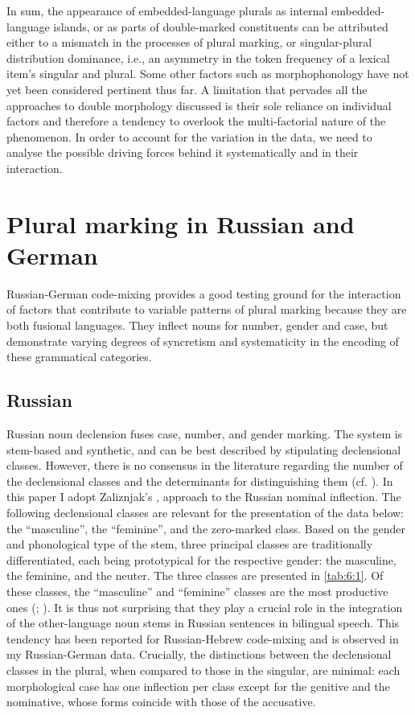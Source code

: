 In sum, the appearance of embedded-language plurals as internal embedded-language islands, or as parts of double-marked constituents can be attributed either to a mismatch in the processes of plural marking, or singular-plural distribution dominance, i.e., an asymmetry in the token frequency of a lexical item’s singular and plural. Some other factors such as morphophonology have not yet been considered pertinent thus far. A limitation that pervades all the approaches to double morphology discussed is their sole reliance on individual factors and therefore a tendency to overlook the multi-factorial nature of the phenomenon. In order to account for the variation in the data, we need to analyse the possible driving forces behind it systematically and in their interaction.

\section{Plural marking in Russian and German}\label{sec:plural marking}

Russian-German code-mixing provides a good testing ground for the interaction of factors that contribute to variable patterns of plural marking because they are both fusional languages. They inflect nouns for number, gender and case, but demonstrate varying degrees of syncretism and systematicity in the encoding of these grammatical categories.

\subsection{Russian}

Russian noun declension fuses case, number, and gender marking. The system is stem-based and synthetic, and can be best described by stipulating declensional classes. However, there is no consensus in the literature regarding the number of the declensional classes and the determinants for distinguishing them (cf. \citealt{corbett91,corbett03}). In this paper I adopt Zaliznjak's \citeyear{zaliznjak02}, \citeyear{zaliznjak09} approach to the Russian nominal inflection. The following declensional classes are relevant for the presentation of the data below: the “masculine”, the “feminine”, and the zero-marked class. Based on the gender and phonological type of the stem, three principal classes are traditionally differentiated, each being prototypical for the respective gender: the masculine, the feminine, and the neuter. The three classes are presented in \ref{tab:6:1}. Of these classes, the “masculine” and “feminine” classes are the most productive ones (\citealt[218]{zaliznjak02}; \citealt[148]{timberlake04}). It is thus not surprising that they play a crucial role in the integration of the other-language noun stems in Russian sentences in bilingual speech. This tendency has been reported for Russian-Hebrew code-mixing \citep{naiditch08} and is observed in my Russian-German data. Crucially, the distinctions between the declensional classes in the plural, when compared to those in the singular, are minimal: each morphological case has one inflection per class except for the genitive and the nominative, whose forms coincide with those of the accusative.

